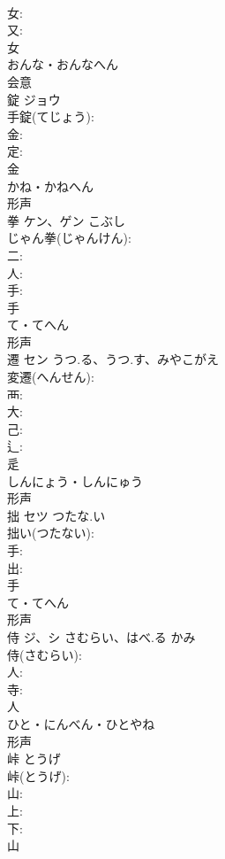 \documentclass[8pt]{extreport}
\begin{document}
\begin{CJK}{UTF8}{min}
\\	女: 
\\	又: 
\\	女	
\\	おんな・おんなへん	
\\	会意 
\\	錠	ジョウ			
\\	手錠(てじょう): 
\\	金: 
\\	定: 
\\	金	
\\	かね・かねへん	
\\	形声 
\\	拳	ケン、ゲン	こぶし		
\\	じゃん拳(じゃんけん): 
\\	二: 
\\	人: 
\\	手: 
\\	手	
\\	て・てへん	
\\	形声 
\\	遷	セン	うつ.る、うつ.す、みやこがえ		
\\	変遷(へんせん): 
\\	襾: 
\\	大: 
\\	己: 
\\	辶: 
\\	辵	
\\	しんにょう・しんにゅう	
\\	形声 
\\	拙	セツ	つたな.い		
\\	拙い(つたない): 
\\	手: 
\\	出: 
\\	手	
\\	て・てへん	
\\	形声 
\\	侍	ジ、シ	さむらい、はべ.る	かみ	
\\	侍(さむらい): 
\\	人: 
\\	寺: 
\\	人	
\\	ひと・にんべん・ひとやね	
\\	形声 
\\	峠		とうげ		
\\	峠(とうげ): 
\\	山: 
\\	上: 
\\	下: 
\\	山	

\end{CJK}
\end{document}
